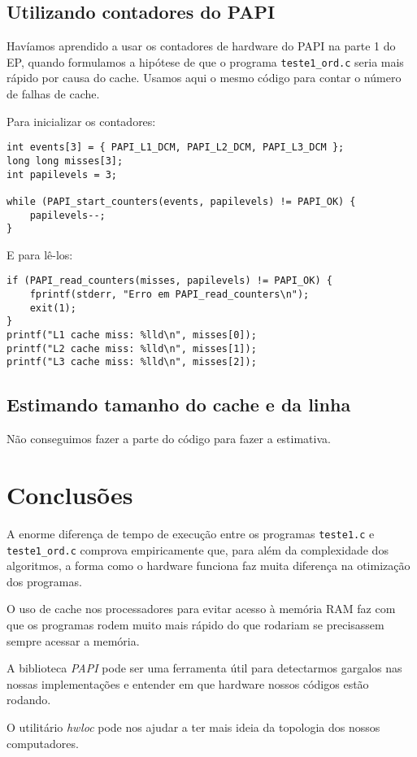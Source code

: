 \documentclass[a4paper,oneside,12pt]{article}
\begin{document}
\subsection{Utilizando contadores do PAPI}

Havíamos aprendido a usar os contadores de hardware do PAPI na parte 1 do EP, quando formulamos a hipótese de que o programa {\tt teste1\_ord.c} seria mais rápido por causa do cache. Usamos aqui o mesmo código para contar o número de falhas de cache.

Para inicializar os contadores:

\begin{verbatim}
int events[3] = { PAPI_L1_DCM, PAPI_L2_DCM, PAPI_L3_DCM };
long long misses[3];
int papilevels = 3;

while (PAPI_start_counters(events, papilevels) != PAPI_OK) {
    papilevels--;
}
\end{verbatim}

E para lê-los:

\begin{verbatim}
if (PAPI_read_counters(misses, papilevels) != PAPI_OK) {
    fprintf(stderr, "Erro em PAPI_read_counters\n");
    exit(1);
}
printf("L1 cache miss: %lld\n", misses[0]);
printf("L2 cache miss: %lld\n", misses[1]);
printf("L3 cache miss: %lld\n", misses[2]);
\end{verbatim}

\subsection{Estimando tamanho do cache e da linha}

Não conseguimos fazer a parte do código para fazer a estimativa.

\section{Conclusões}

A enorme diferença de tempo de execução entre os programas {\tt teste1.c} e {\tt teste1\_ord.c} comprova empiricamente que, para além da complexidade dos algoritmos, a forma como o hardware funciona faz muita diferença na otimização dos programas.

O uso de cache nos processadores para evitar acesso à memória RAM faz com que os programas rodem muito mais rápido do que rodariam se precisassem sempre acessar a memória.

A biblioteca \emph{PAPI} pode ser uma ferramenta útil para detectarmos gargalos nas nossas implementações e entender em que hardware nossos códigos estão rodando.

O utilitário \emph{hwloc} pode nos ajudar a ter mais ideia da topologia dos nossos computadores.
\end{document}
